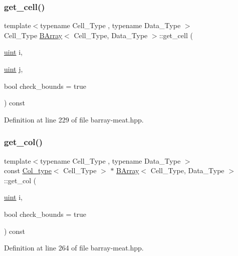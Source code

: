 \subsubsection{\texorpdfstring{get\+\_\+cell()}{get\_cell()}}
{\footnotesize\ttfamily template$<$typename Cell\+\_\+\+Type , typename Data\+\_\+\+Type $>$ \\
Cell\+\_\+\+Type \hyperlink{class_b_array}{B\+Array}$<$ Cell\+\_\+\+Type, Data\+\_\+\+Type $>$\+::get\+\_\+cell (\begin{DoxyParamCaption}\item[{\hyperlink{typedefs_8hpp_a91ad9478d81a7aaf2593e8d9c3d06a14}{uint}}]{i,  }\item[{\hyperlink{typedefs_8hpp_a91ad9478d81a7aaf2593e8d9c3d06a14}{uint}}]{j,  }\item[{bool}]{check\+\_\+bounds = {\ttfamily true} }\end{DoxyParamCaption}) const\hspace{0.3cm}{\ttfamily [inline]}}



Definition at line 229 of file barray-\/meat.\+hpp.

\mbox{\label{class_b_array_a90bd31bc0b3fa59d11150cd4ea39b3b6}} 
\subsubsection{\texorpdfstring{get\+\_\+col()}{get\_col()}}
{\footnotesize\ttfamily template$<$typename Cell\+\_\+\+Type , typename Data\+\_\+\+Type $>$ \\
const \hyperlink{typedefs_8hpp_a3bb95a7612ee928fba42f33a96adb3eb}{Col\+\_\+type}$<$ Cell\+\_\+\+Type $>$ $\ast$ \hyperlink{class_b_array}{B\+Array}$<$ Cell\+\_\+\+Type, Data\+\_\+\+Type $>$\+::get\+\_\+col (\begin{DoxyParamCaption}\item[{\hyperlink{typedefs_8hpp_a91ad9478d81a7aaf2593e8d9c3d06a14}{uint}}]{i,  }\item[{bool}]{check\+\_\+bounds = {\ttfamily true} }\end{DoxyParamCaption}) const\hspace{0.3cm}{\ttfamily [inline]}}



Definition at line 264 of file barray-\/meat.\+hpp.

\mbox{\label{class_b_array_aa2d5a133fc4adf3417f1fdc2ef5aae26}} 
